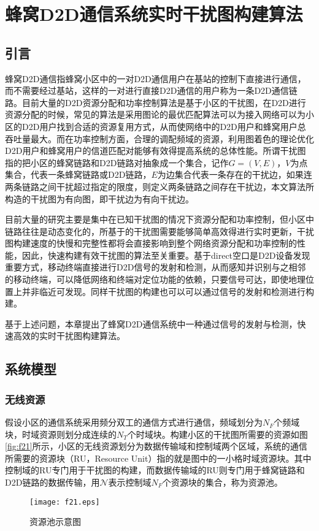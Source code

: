 \documentclass[figurelist,tablelist,algorithmlist,nomlist,masters]{seuthesix}
\begin{document}
	\chapter{蜂窝D2D通信系统实时干扰图构建算法}
	\section{引言}
	蜂窝D2D通信指蜂窝小区中的一对D2D通信用户在基站的控制下直接进行通信，而不需要经过基站，这样的一对进行直接D2D通信的用户称为一条D2D通信链路。目前大量的D2D资源分配和功率控制算法是基于小区的干扰图，在D2D进行资源分配的时候，常见的算法是采用图论的最优匹配算法可以为接入网络可以为小区的D2D用户找到合适的资源复用方式，从而使网络中的D2D用户和蜂窝用户总吞吐量最大。而在功率控制方面，合理的调配频域的资源，利用图着色的理论优化D2D用户和蜂窝用户的信道匹配对能够有效得提高系统的总体性能。所谓干扰图指的把小区的蜂窝链路和D2D链路对抽象成一个集合，记作$G=(V,E)$，$V$为点集合，代表一条蜂窝链路或D2D链路，$E$为边集合代表一条存在的干扰边，如果连两条链路之间干扰超过指定的限度，则定义两条链路之间存在干扰边，本文算法所构造的干扰图为有向图，即干扰边为有向干扰边。
	
	目前大量的研究主要是集中在已知干扰图的情况下资源分配和功率控制，但小区中链路往往是动态变化的，所基于的干扰图需要能够简单高效得进行实时更新，干扰图构建速度的快慢和完整性都将会直接影响到整个网络资源分配和功率控制的性能，因此，快速构建有效干扰图的算法至关重要。基于direct空口是D2D设备发现重要方式，移动终端直接进行D2D信号的发射和检测，从而感知并识别与之相邻的移动终端，可以降低网络和终端对定位功能的依赖，只要信号可达，即使地理位置上并非临近可发现。同样干扰图的构建也可以可以通过信号的发射和检测进行构建。
	
	基于上述问题，本章提出了蜂窝D2D通信系统中一种通过信号的发射与检测，快速高效的实时干扰图构建算法。
	
	\section{系统模型}
	\subsection{无线资源}
	假设小区的通信系统采用频分双工的通信方式进行通信，频域划分为$N_{F}$个频域块，时域资源则划分成连续的$N_{T}$个时域块。构建小区的干扰图所需要的资源如图\ref{fig:f21}所示，小区的无线资源划分为数据传输域和控制域两个区域，系统的通信所需要的资源块（RU，Resource Unit）指的就是图中的一小格时域资源块。其中控制域的RU专门用于干扰图的构建，而数据传输域的RU则专门用于蜂窝链路和D2D链路的数据传输，用$\mathcal{N}$表示控制域$N_{F}$个资源块的集合，称为资源池。
	\begin{figure}[htb]
		\centering
		\texttt{[image: f21.eps]}
		\caption{资源池示意图}\label{f21}
	\end{figure}
	
\end{document}
